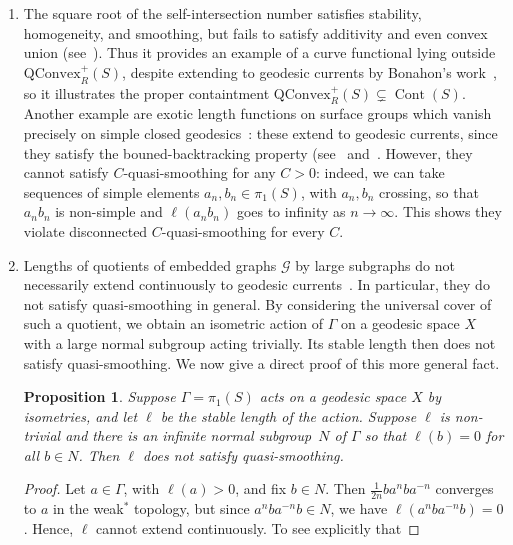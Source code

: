 \documentclass[11pt]{amsart}
\numberwithin{equation}{section}
\numberwithin{figure}{section}
\newtheorem{proposition}[theorem]{Proposition}
\theoremstyle{definition}
\theoremstyle{plain}
\newcommand{\QConvex}{\mathrm{QConvex}}
\begin{document}
\begin{enumerate}
Since this class includes ordinary word length (cf.\ the previous
item), such translation lengths do not satisfy smoothing in general.
    \item The square root of the self-intersection number satisfies stability,
homogeneity, and smoothing, but fails to satisfy additivity and even
convex union (see~\cite[Example~1.12]{MGT21:Smoothings}). 
Thus it provides an example of a curve functional lying outside
$\QConvex_R^+(S)$, despite extending to geodesic currents by
Bonahon’s work~\cite{Bonahon86:EndsHyperbolicManifolds}, so it illustrates the proper containtment $\QConvex_R^+(S) \subsetneq \operatorname{Cont}(S)$. Another example are exotic length functions on surface groups which vanish precisely on simple closed geodesics~\cite[Section~9]{CMGR26:GreenMetrics}: these extend to geodesic currents, since they satisfy the bouned-backtracking property (see~\cite{CR25:Manhattan} and~\cite[Section~7]{CMGR26:GreenMetrics}. However, they cannot satisfy $C$-quasi-smoothing for any $C>0$: indeed, we can take sequences of simple elements $a_n,b_n \in \pi_1(S)$, with $a_n, b_n$ crossing, so that $a_nb_n$ is non-simple and $\ell(a_n b_n)$ goes to infinity as $n \to \infty$. This shows they violate disconnected $C$-quasi-smoothing for every $C$.
\item
  Lengths of quotients of embedded graphs $\mathcal{G}$ by large subgraphs do not necessarily extend continuously to geodesic
  currents~\cite[Proposition~11]{Bonahon91:CurrentsGroups}. In particular, they
do not satisfy quasi-smoothing in general. By considering the
universal cover of such  a quotient, we obtain an isometric action of
$\Gamma$ on a geodesic space $X$ with a large normal subgroup acting
trivially. Its stable length then does not satisfy quasi-smoothing.
We now give a direct proof of this more general fact.
\begin{proposition}
Suppose $\Gamma=\pi_1(S)$ acts on a geodesic space $X$ by isometries, and
let $\ell$ be the stable length of the action. Suppose $\ell$ is
non-trivial and there is an infinite normal subgroup~$N$ of $\Gamma$ so that $\ell(b)=0$ for all $b \in N$. Then $\ell$ does not satisfy quasi-smoothing.
\label{prop:graph_collapse}
\end{proposition}
\begin{proof} Let $a \in \Gamma$, with $\ell(a)>0$, and fix $b\in N$. Then $\frac{1}{2n} b a^n b a^{-n}$ converges to $a$ in the weak$^*$ topology, but since $a^n b a^{-n} b\in N$, we have $\ell(a^n b a^{-n} b)=0$.
Hence, $\ell$ cannot extend continuously. To see explicitly that

\end{proof}
\end{enumerate}
\end{document}
